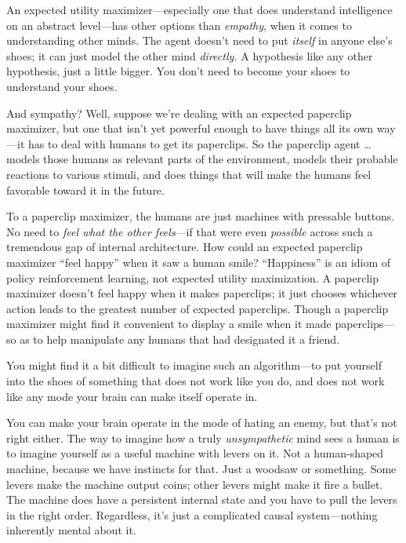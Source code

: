 {
 An expected utility maximizer---especially one that does
understand intelligence on an abstract level---has other options than
\textit{empathy}, when it comes to understanding other minds. The agent
doesn't need to put \textit{itself} in anyone
else's shoes; it can just model the other mind
\textit{directly.} A hypothesis like any other hypothesis, just a
little bigger. You don't need to become your shoes to
understand your shoes.}

{
 And sympathy? Well, suppose we're dealing with an
expected paperclip maximizer, but one that isn't yet
powerful enough to have things all its own way---it has to deal with
humans to get its paperclips. So the paperclip agent \ldots models those
humans as relevant parts of the environment, models their probable
reactions to various stimuli, and does things that will make the humans
feel favorable toward it in the future.}

{
 To a paperclip maximizer, the humans are just machines with
pressable buttons. No need to \textit{feel what the other feels}{}---if
that were even \textit{possible} across such a tremendous gap of
internal architecture. How could an expected paperclip maximizer
``feel happy'' when it saw a human
smile? ``Happiness'' is an idiom of
policy reinforcement learning, not expected utility maximization. A
paperclip maximizer doesn't feel happy when it makes
paperclips; it just chooses whichever action leads to the greatest
number of expected paperclips. Though a paperclip maximizer might find
it convenient to display a smile when it made paperclips---so as to
help manipulate any humans that had designated it a friend.}

{
 You might find it a bit difficult to imagine such an
algorithm---to put yourself into the shoes of something that does not
work like you do, and does not work like any mode your brain can make
itself operate in.}

{
 You can make your brain operate in the mode of hating an enemy,
but that's not right either. The way to imagine how a
truly \textit{unsympathetic} mind sees a human is to imagine yourself
as a useful machine with levers on it. Not a human-shaped machine,
because we have instincts for that. Just a woodsaw or something. Some
levers make the machine output coins; other levers might make it fire a
bullet. The machine does have a persistent internal state and you have
to pull the levers in the right order. Regardless, it's
just a complicated causal system---nothing inherently mental about it.}

